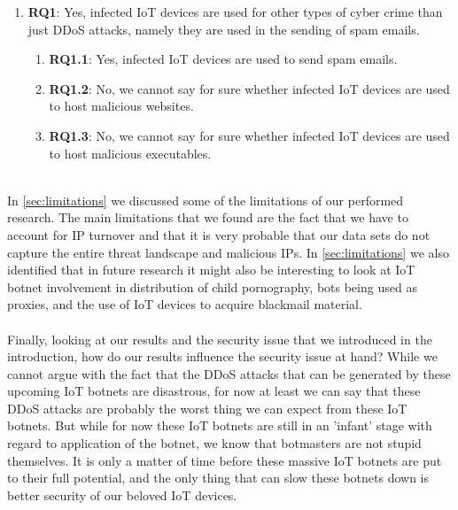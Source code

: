 \documentclass[a4paper,10pt]{article}
\begin{document}
\begin{enumerate}
    \item[] \textbf{RQ1}: Yes, infected IoT devices are used for other types of cyber crime than just DDoS attacks, namely
    they are used in the sending of spam emails.
    \begin{enumerate}
        \item[] \textbf{RQ1.1}: Yes,  infected IoT devices are used to send spam emails. 
        \item[] \textbf{RQ1.2}: No, we cannot say for sure whether infected IoT devices are used to host malicious websites.
        \item[] \textbf{RQ1.3}: No, we cannot say for sure whether infected IoT devices are used to host malicious executables.
    \end{enumerate}
\end{enumerate}
~\\
In \autoref{sec:limitations} we discussed some of the limitations of our performed research. The main limitations that we
found are the fact that we have to account for IP turnover and that it is very probable that our data sets do not capture the
entire threat landscape and malicious IPs. In \autoref{sec:limitations} we also identified that in future research it might also
be interesting to look at IoT botnet involvement in  distribution of child pornography, bots being used as proxies, and the 
use of IoT devices to acquire blackmail material.
\\\\
Finally, looking at our results and the security issue that we introduced in the introduction, how do our results influence the
security issue at hand? While we cannot argue with the fact that the DDoS attacks that can be generated by these upcoming
IoT botnets are disastrous, for now at least we can say that these DDoS attacks are probably the worst thing we can expect from
these IoT botnets. But while for now these IoT botnets are still in an 'infant' stage with regard to application of the botnet,
we know that botmasters are not stupid themselves. It is only a matter of time before these massive IoT botnets are put
to their full potential, and the only thing that can slow these botnets down is better security of our beloved IoT devices.




\appendix
\end{document}
